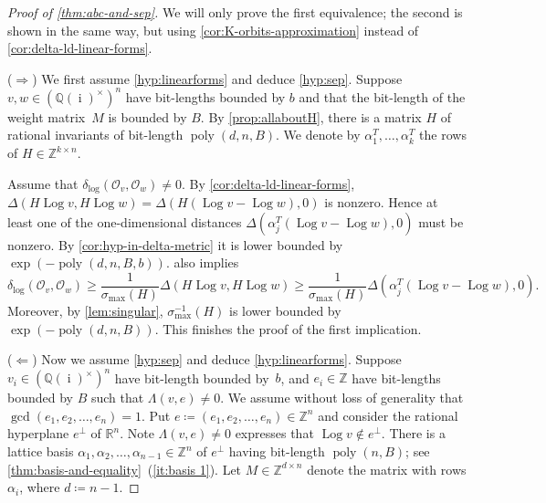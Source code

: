 \documentclass[10pt,a4paper]{article}
\theoremstyle{definition}
\DeclareMathOperator{\poly}{poly}
\DeclareMathOperator{\sep}{sep}
\DeclareMathOperator{\ii}{i}
\DeclareMathOperator{\Log}{Log}
\newcommand{\distLD}{\delta_{\log}}
\newcommand{\QQ}{\mathbb{Q}}
\newcommand{\ZZ}{\mathbb{Z}}
\newcommand{\RR}{\mathbb{R}}
\newcommand{\OO}{\ensuremath{\mathcal{O}}}
\numberwithin{equation}{section}
\begin{document}
\begin{proof}[Proof of \cref{thm:abc-and-sep}]
We will only prove the first equivalence; the second is shown in the same way,
but using \cref{cor:K-orbits-approximation}
instead of \cref{cor:delta-ld-linear-forms}.

($\Rightarrow$)
We first assume \cref{hyp:linearforms} and deduce \cref{hyp:sep}.
Suppose $v,w\in(\QQ(\ii)^\times)^n$ have bit-lengths bounded by $b$
and that the bit-length of the weight matrix~$M$ is bounded by $B$.
By  \cref{prop:allaboutH}, there is a matrix $H$ of rational invariants
of bit-length $\poly(d,n,B)$.
We denote by $\alpha_1^T,\dots,\alpha_k^T$ the rows of $H\in\ZZ^{k\times n}$.

Assume that $\distLD(\OO_v,\OO_w)\neq 0$.
By \cref{cor:delta-ld-linear-forms},
$\Delta(H\Log v,H\Log w)=\Delta(H(\Log v-\Log w), 0)$ is nonzero.
Hence at least one of the one-dimensional distances
$\Delta(\alpha_j^T (\Log v-\Log w),0)$ %
must be nonzero.
By \cref{cor:hyp-in-delta-metric} it
is lower bounded by $\exp(-\poly(d,n,B,b))$.
 also implies
\begin{equation}\label{eq:form-lower-bound}
	\distLD(\OO_v,\OO_w) \geq \frac{1}{\sigma_{\max}(H)} \Delta(H\Log v, H\Log w)
    \ge \frac{1}{\sigma_{\max}(H)} \Delta(\alpha_j^T (\Log v-\Log w),0) .
\end{equation}
Moreover, by \cref{lem:singular},
$\sigma^{-1}_{\max}(H)$ is lower bounded by $\exp(-\poly(d,n,B))$.
This
finishes the proof of the first implication.

($\Leftarrow$) Now we assume \cref{hyp:sep} and deduce \cref{hyp:linearforms}.
Suppose $v_i\in(\QQ(\ii)^\times)^n$ have bit-length bounded by~$b$,
and $e_i\in\ZZ$ have bit-lengths bounded by $B$ such that $\Lambda(v,e)\neq 0$.
We assume without loss of generality that $\gcd(e_1,e_2,\dots,e_n)=1$.
Put $e\coloneqq(e_1,e_2,\dots,e_n)\in\ZZ^n$ and consider
the rational hyperplane $e^{\perp}$ of $\RR^n$.
Note $\Lambda(v,e)\neq 0$ expresses that $\Log v \not\in e^{\perp}$.
There is a lattice basis $\alpha_1,\alpha_2,\dots,\alpha_{n-1}\in\ZZ^n$ of $e^{\perp}$
having bit-length $\poly(n,B)$;
see \cref{thm:basis-and-equality}~(\ref{it:basis 1}).
Let $M\in\ZZ^{d\times n}$ denote the matrix with rows $\alpha_i$,
where $d\coloneqq n-1$.


\end{proof}
\end{document}
